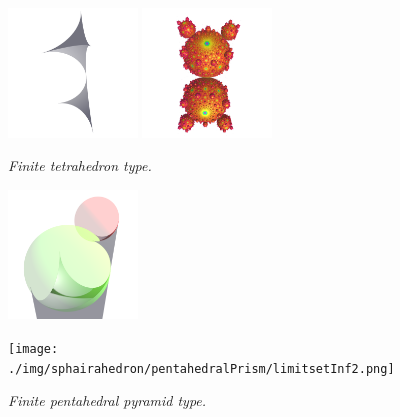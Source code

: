 \documentclass[dvipdfmx]{interact}
\theoremstyle{plain}%
\theoremstyle{definition}
\theoremstyle{remark}
\theoremstyle{problemstyle}
\begin{document}
\begin{figure}[H]
 \begin{minipage}{0.5\textwidth}
  \begin{minipage}[t]{0.24\textwidth}
   \centering
   \includegraphics[width=1.35in, height=1.35in, keepaspectratio]{./img/sphairahedron/pentahedralPrism/sphairahedronFinite2.png}
  \end{minipage}
  \hspace*{\fill}
  \begin{minipage}[t]{0.24\textwidth}
   \centering
   \includegraphics[width=1.35in, height=1.35in, keepaspectratio]{./img/sphairahedron/pentahedralPrism/limitsetFinite2.png}
  \end{minipage}
  \hspace*{\fill}
  \caption{\textit{Finite tetrahedron type.}}
  \label{fig:pentahedralPyramidFinite}
 \end{minipage}
 \hspace*{\fill}
 \begin{minipage}{0.5\textwidth}
  \begin{minipage}[t]{0.24\textwidth}
   \centering
   \includegraphics[width=1.35in, height=1.35in, keepaspectratio]{./img/sphairahedron/pentahedralPrism/sphairahedronInf2.png}
  \end{minipage}
  \hspace*{\fill}
  \begin{minipage}[t]{0.24\textwidth}
   \centering
   \texttt{[image: ./img/sphairahedron/pentahedralPrism/limitsetInf2.png]}
  \end{minipage}
  \hspace*{\fill}
  \caption{\textit{Finite pentahedral pyramid type.}}
  \label{fig:pentahedralPyramidInf}
 \end{minipage}
\end{figure}
\end{document}
